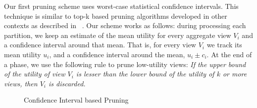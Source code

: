 \label{sec:confidence_interval}
Our first pruning scheme uses worst-case statistical confidence intervals.
This technique is similar to top-k based pruning algorithms developed 
in other contexts as described in ~\cite{DBLP:conf/pods/FaginLN01, 
DBLP:conf/vldb/IlyasAE04, DBLP:conf/ICDE/ReDS07}.
Our scheme works as follows: during processing each partition,
we keep an estimate of the mean utility for every aggregate view $V_i$ and a
confidence interval around that mean.
That is, for every view $V_i$ we track its mean utility $u_i$, and a
confidence interval around the mean, $u_i \pm c_i$. 
At the end of a phase, we use the following rule to prune low-utility
views:
{\em If the upper bound of the utility of view $V_i$ is lesser
than the lower bound of the utility of $k$ or more views, then $V_i$ is discarded.}

\begin{figure}[h]
\vspace{-10pt}
\centerline{
\hbox{}}
\vspace{-20pt}
\caption{Confidence Interval based Pruning}
\label{fig:conf_interval}
\vspace{-15pt}
\end{figure}


